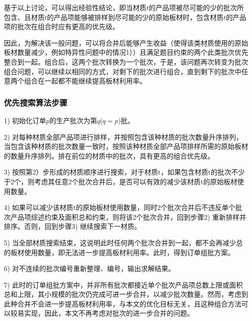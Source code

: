 \documentclass[bwprint]{gmcmthesis}
\begin{document}
基于以上讨论，可以得出经验性结论，即当材质$t$的产品项被尽可能的少的批次所包含、且材质$t$的产品项能够被排样到尽可能的少的原始板材时，包含材质$t$的产品项的批次在组合时应有更高的优先级。

因此，为解决该一般问题，可以将合并后能够产生收益（使得该类材质使用的原始板材数量减少，例如特异性问题中的情况1））且满足题目约束的两个此类批次优先整合到一起。组合后，这两个批次转换为一个批次，于是，该问题再次转变为批次组合问题，可以继续以相同的方式，对剩下的批次进行组合，直到剩下的批次中任意两个组合在一起都不能继续提高板材利用率。



\subsubsection{优先搜索算法步骤}

1) 初始化订单$p$的生产批次为第$q$($q=p$)批。

2) 对每种材质全部产品项进行排样，并按照包含该种材质的批次数量升序排列，当包含该种材质的批次数量一致时，按照该种材质全部产品项排样所需的原始板材的数量升序排列。排在前位的材质中的批次，具有更高的组合优先级。

3) 按照第2）步形成的材质顺序进行搜索，对于材质t，如果包含材质t的批次不少于2个，则考虑其任意2个批次合并后，是否可以有效的减少该材质t的原始板材使用数量。

4) 如果可以减少该材质t的原始板材使用数量，同时2个批次合并后不违反单个批次产品项综述约束及面积总和约束，则将该2个批次合并，回到步骤2) 重新排样并排序。否则，回到步骤3) 继续搜索下一材质。

5) 当全部材质搜索结束，这说明此时任何两个批次合并到一起，都不会再减少总的板材使用数量，即无法进一步提高板材利用率。此时，得到订单组批方案。

6) 对不连续的批次编号重新整理、编号，输出求解结果。

7) 此时的订单组批方案中，并非所有批次都接近单个批次产品项总数上限或面积总和上限，其小规模的批次仍完成可进一步合并，以减少批次数量。然而，考虑到此种合并不会进一步提高板材利用率，与本文的优化目标无关，且这种组合方法可以较易实现，因此，本文不再考虑对批次的进一步合并的问题。

\end{document}
